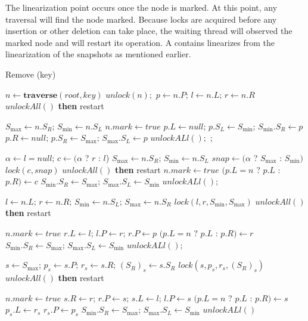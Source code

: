 \documentclass[conference]{IEEEtran}
\theoremstyle{definition}
\theoremstyle{theorem}
\renewcommand{\O}{\,||\,}
\newcommand{\A}{\,\&\&\,}
\begin{document}
The linearization point occurs once the node is marked. At this point, any traversal will find the node marked. Because locks are acquired before any insertion or other deletion can take place, the waiting thread will observed the marked node and will restart its operation. A contains linearizes from the linearization of the snapshots as mentioned earlier.

\begin{algorithm}[th]
\caption{Remove (key)}
\label{alg:remove}
\begin{algorithmic}[1]
\State $n\gets \mathbf{traverse}(root, key)$
 $unlock(n);$ \Return
\EndIf
\State $p \gets n.P;\,l\gets n.L;\, r\gets n.R$
 $unlockAll()$ \textbf{then} restart
\EndIf

	\State $S_{\max} \gets n.S_R;\, S_{\min} \gets n.S_L$
	\State $n.mark\gets true$
	\label{alg:remove:leaf}
		\State $p.L \gets null;\,p.S_L \gets S_{\min};\, S_{\min}.S_R \gets p$
	\Else
		\State $p.R \gets null;\,p.S_R \gets S_{\max};\, S_{\max}.S_L \gets p$
	\EndIf
	\State $unlockALl();$ \Return;
\EndIf

	\State $\alpha \gets l=null;\, c\gets (\alpha$ ? $r$ : $l$)
	\State $S_{\max} \gets n.S_R;\,S_{\min} \gets n.S_L$
	\State $snap \gets (\alpha$ ? $S_{\max}$ : $S_{\min})$
	\State $lock(c, snap)$
	\If {($\alpha \A snap.S_L \neq n) \O (!\alpha \A snap.S_R \neq n$)}
		\State $unlockAll()$ \textbf{then} restart
	\EndIf
	\State $n.mark\gets true$
	\State $(p.L = n$ ? $p.L$ : $p.R) \gets c$
	\State $S_{\min}.S_R \gets S_{\max};\,S_{\max}.S_L \gets S_{\min}$ \label{alg:remove:child}
	\State $unlockALl();$
	\Return
\EndIf

\State $l \gets n.L;\,r\gets n.R;\,S_{\min} \gets n.S_L;\,S_{\max} \gets n.S_R$
\State $lock(l, r, S_{\min}, S_{\max})$
	\State $unlockAll()$ \textbf{then} restart
\EndIf

	\State $n.mark \gets true$
	\State $r.L \gets l;\,l.P \gets r;\,r.P\gets p$
	\State $(p.L=n $ ? $p.L$ : $p.R) \gets r$
	\State $S_{\min}.S_R \gets S_{\max};\,S_{\max}.S_L \gets S_{\min}$
	\State $unlockALl();$
	\Return
\EndIf

\State $s\gets S_{\max};\,p_s \gets s.P; \,r_s \gets s.R;\,({S_R})_s \gets s.S_R$
\State $lock(s, p_s, r_s, ({S_R})_s)$
	\State $unlockAll()$ \textbf{then} restart
\EndIf

\State $n.mark\gets true$
\State $s.R\gets r;\, r.P \gets s;\, s.L\gets l;\, l.P \gets s$
\State $(p.L=n $ ? $p.L$ : $p.R) \gets s$
\State $p_s.L\gets r_s$
 $r_s.P\gets p_s$
\EndIf
\State $S_{\min}.S_R \gets S_{\max};\,S_{\max}.S_L \gets S_{\min}$ \label{alg:remove:hard:snap}
\State $unlockALl()$
\end{algorithmic}
\end{algorithm}
\end{document}
